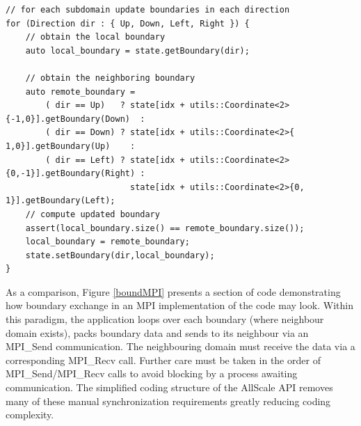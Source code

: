 \documentclass[acmsmall,review,anonymous]{acmart}\settopmatter{printfolios=true,printccs=false,printacmref=false}
\begin{document}
\begin{lstlisting}[caption=AllScale boundary exchange implementation, label=boundAllScale]
// for each subdomain update boundaries in each direction
for (Direction dir : { Up, Down, Left, Right }) {
    // obtain the local boundary
    auto local_boundary = state.getBoundary(dir);

    // obtain the neighboring boundary
    auto remote_boundary =
        ( dir == Up)   ? state[idx + utils::Coordinate<2>{-1,0}].getBoundary(Down)  :
        ( dir == Down) ? state[idx + utils::Coordinate<2>{ 1,0}].getBoundary(Up)    :
        ( dir == Left) ? state[idx + utils::Coordinate<2>{0,-1}].getBoundary(Right) :
                         state[idx + utils::Coordinate<2>{0, 1}].getBoundary(Left);
    // compute updated boundary
    assert(local_boundary.size() == remote_boundary.size());
    local_boundary = remote_boundary;
    state.setBoundary(dir,local_boundary);
}
\end{lstlisting}

As a comparison, Figure \ref{boundMPI} presents a section of code demonstrating how boundary exchange in an MPI implementation of the code may look. Within this paradigm, the application loops over each boundary (where neighbour domain exists), packs boundary data and sends to its neighbour via an MPI\_Send communication. The neighbouring domain must receive the data  via a  corresponding MPI\_Recv call. Further care must be taken in the order of MPI\_Send/MPI\_Recv calls to avoid blocking by a process awaiting communication. The simplified coding structure of the AllScale API removes many of these manual synchronization requirements greatly reducing coding complexity.
\end{document}
